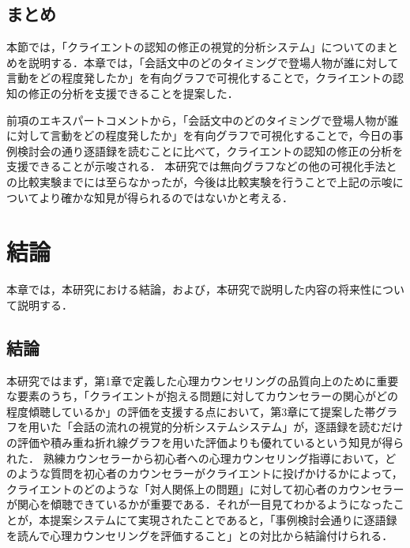 \documentclass[shuuron]{kuee}
\begin{document}
\section{まとめ}%
本節では，「クライエントの認知の修正の視覚的分析システム」についてのまとめを説明する．本章では，「会話文中のどのタイミングで登場人物が誰に対して言動をどの程度発したか」を有向グラフで可視化することで，クライエントの認知の修正の分析を支援できることを提案した．

前項のエキスパートコメントから，「会話文中のどのタイミングで登場人物が誰に対して言動をどの程度発したか」を有向グラフで可視化することで，今日の事例検討会の通り逐語録を読むことに比べて，クライエントの認知の修正の分析を支援できることが示唆される．
本研究では無向グラフなどの他の可視化手法との比較実験までには至らなかったが，今後は比較実験を行うことで上記の示唆についてより確かな知見が得られるのではないかと考える．


\chapter{結論}%

本章では，本研究における結論，および，本研究で説明した内容の将来性について説明する．

\section{結論}

本研究ではまず，第1章で定義した心理カウンセリングの品質向上のために重要な要素のうち，「クライエントが抱える問題に対してカウンセラーの関心がどの程度傾聴しているか」の評価を支援する点において，第3章にて提案した帯グラフを用いた「会話の流れの視覚的分析システムシステム」が，逐語録を読むだけの評価や積み重ね折れ線グラフを用いた評価よりも優れているという知見が得られた．
%
熟練カウンセラーから初心者への心理カウンセリング指導において，どのような質問を初心者のカウンセラーがクライエントに投げかけるかによって，クライエントのどのような「対人関係上の問題」に対して初心者のカウンセラーが関心を傾聴できているかが重要である．それが一目見てわかるようになったことが，本提案システムにて実現されたことであると，「事例検討会通りに逐語録を読んで心理カウンセリングを評価すること」との対比から結論付けられる．%
\end{document}
